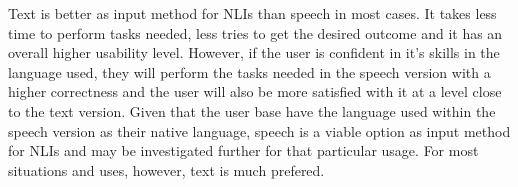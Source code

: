 Text is better as input method for NLIs than speech in most cases. It takes less time to perform tasks needed, less tries to get the desired outcome and it has an overall higher usability level. However, if the user is confident in it's skills in the language used, they will perform the tasks needed in the speech version with a higher correctness and the user will also be more satisfied with it at a level close to the text version. Given that the user base have the language used within the speech version as their native language, speech is a viable option as input method for NLIs and may be investigated further for that particular usage. For most situations and uses, however, text is much prefered.